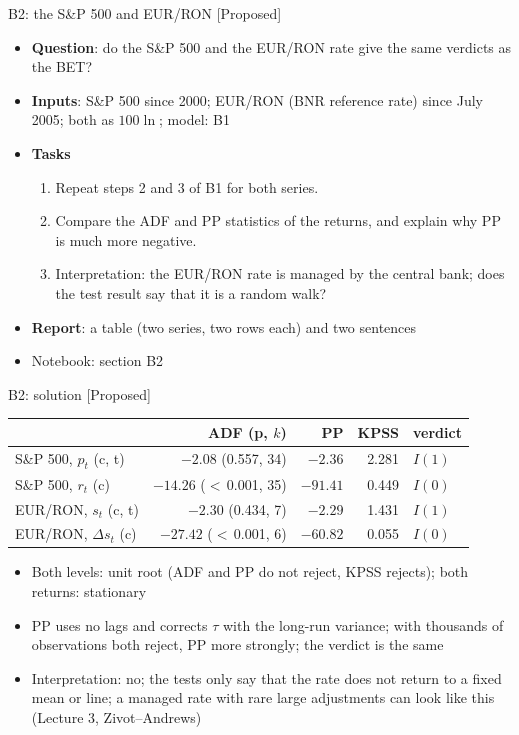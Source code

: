 \begin{frame}{B2: the S\&P 500 and EUR/RON [Proposed]}
\itemsize{\footnotesize}
\begin{itemize}
\item \textbf{Question}: do the S\&P 500 and the EUR/RON rate give the same verdicts as the BET?
\item \textbf{Inputs}: S\&P 500 since 2000; EUR/RON (BNR reference rate) since July 2005; both as $100\ln$; model: B1
\item \textbf{Tasks}
\begin{enumerate}
    \item Repeat steps 2 and 3 of B1 for both series.
    \item Compare the ADF and PP statistics of the returns, and explain why PP is much more negative.
    \item Interpretation: the EUR/RON rate is managed by the central bank; does the test result say that it is a random walk?
\end{enumerate}
\item \textbf{Report}: a table (two series, two rows each) and two sentences
\item Notebook: section B2
\end{itemize}
\end{frame}

\ifsolutions
\begin{frame}{B2: solution [Proposed]}
\itemsize{\scriptsize}
\begin{center}
\scriptsize
\begin{tabular}{lrrrl}
\toprule
& ADF (p, $k$) & PP & KPSS & \textbf{verdict} \\
\midrule
S\&P 500, $p_t$ (c, t) & $-2.08$ (0.557, 34) & $-2.36$ & 2.281 & $I(1)$ \\
S\&P 500, $r_t$ (c) & $-14.26$ ($<$\,0.001, 35) & $-91.41$ & 0.449 & $I(0)$ \\
EUR/RON, $s_t$ (c, t) & $-2.30$ (0.434, 7) & $-2.29$ & 1.431 & $I(1)$ \\
EUR/RON, $\Delta s_t$ (c) & $-27.42$ ($<$\,0.001, 6) & $-60.82$ & 0.055 & $I(0)$ \\
\bottomrule
\end{tabular}
\end{center}
\begin{itemize}
    \item Both levels: unit root (ADF and PP do not reject, KPSS rejects); both returns: stationary
    \item PP uses no lags and corrects $\tau$ with the long-run variance; with thousands of observations both reject, PP more strongly; the verdict is the same
    \item Interpretation: no; the tests only say that the rate does not return to a fixed mean or line; a managed rate with rare large adjustments can look like this (Lecture 3, Zivot--Andrews)
\end{itemize}
\end{frame}
\fi


